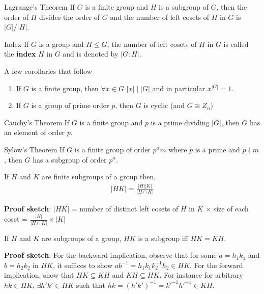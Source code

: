 \documentclass[titlepage, 12pt]{article}
\begin{document}
\begin{theorem}{Lagrange's Theorem}{}
    If $G$ is a finite group and $H$ is a subgroup of $G$, then the order of $H$
    divides the order of $G$ and the number of left cosets of $H$ in $G$ is
    $|G|/|H|$.
\end{theorem}
\begin{definition}{Index}{}
    If $G$ is a group and $H\le G$, the number of left cosets of $H$ in $G$ is
    called the \textbf{index} $H$ in $G$ and is denoted by $|G:H|$.
\end{definition}
A few corollaries that follow
\begin{enumerate}
    \item If $G$ is a finite group, then $\forall x\in G$ $|x|\mid |G|$ and in
        particular $x^{|G|} = 1$.
    \item If $G$ is a group of prime order $p$, then $G$ is cyclic (and $G\cong
        Z_n$)
\end{enumerate}
\begin{theorem}{Cauchy's Theorem}{}
    If $G$ is a finite group and $p$ is a prime dividing $|G|$, then $G$ has an
    element of order $p$.
\end{theorem}
\begin{theorem}{Sylow's Theorem}{}
    If $G$ is a finite group of order $p^\alpha m$ where $p$ is a prime and
    $p\nmid m$, then $G$ has a subgroup of order $p^\alpha$.
\end{theorem}
\begin{proposition}{}{}
    If $H$ and $K$ are finite subgroups of a group then,
    \begin{gather*}
        |HK| = \frac{|H||K|}{|H\cap K|}
    \end{gather*}
\end{proposition}{}{}
\textbf{Proof sketch}: $|HK|$ = number of distinct left cosets of $H$ in $K$
$\times$ size of each coset = $\frac{|H|}{|H\cap K|}\times |K|$
\begin{proposition}{}{}
    If $H$ and $K$ are subgroups of a group, $HK$ is a subgroup iff $HK = KH$.
\end{proposition}
\textbf{Proof sketch}: For the backward implication, observe that for some $a =
h_1k_1$ and $b = h_2k_2$ in $HK$, it suffices to show $ab^{-1} =
h_1k_1k_2^{-1}h_2\in HK$. For the forward implication, show that $HK\subseteq
KH$ and $KH\subseteq HK$. For instance for arbitrary $hk\in HK$, $\exists h'k'\in HK$
such that $hk = (h'k')^{-1} = k'^{-1}h'^{-1}\in KH$.
\end{document}
